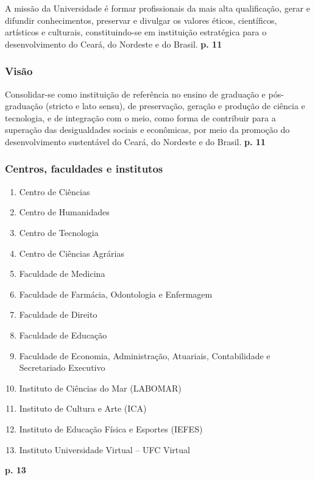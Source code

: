 \documentclass{article}
\begin{document}
A missão da Universidade é formar profissionais da mais alta qualificação, gerar e difundir conhecimentos, preservar e divulgar os valores éticos, científicos, artísticos e culturais, constituindo-se em instituição estratégica para o desenvolvimento do Ceará, do Nordeste e do Brasil.
\textbf{p. 11}

\subsubsection*{Visão}

Consolidar-se como instituição de referência no ensino de graduação e pós-graduação (stricto e lato sensu), de preservação, geração e produção de ciência e tecnologia, e de integração com o meio, como forma de contribuir para a superação das desigualdades sociais e econômicas, por meio da promoção do desenvolvimento sustentável do Ceará, do Nordeste e do Brasil.
\textbf{p. 11}

\subsubsection*{Centros, faculdades e institutos}

\begin{enumerate}
\item 
Centro de Ciências
\item 
Centro de Humanidades
\item 
Centro de Tecnologia
\item 
Centro de Ciências Agrárias
\item 
Faculdade de Medicina
\item 
Faculdade de Farmácia, Odontologia e Enfermagem
\item 
Faculdade de Direito
\item 
Faculdade de Educação
\item 
Faculdade de Economia, Administração, Atuariais, Contabilidade e Secretariado Executivo
\item 
Instituto de Ciências do Mar (LABOMAR)
\item 
Instituto de Cultura e Arte (ICA)
\item 
Instituto de Educação Física e Esportes (IEFES)
\item 
Instituto Universidade Virtual – UFC Virtual
\end{enumerate}
\textbf{p. 13}
\end{document}
